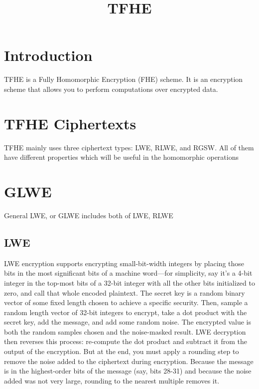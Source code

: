 \documentclass{techrep}
\title{TFHE}
\theoremstyle{definition}
\theoremstyle{plain}
\begin{document}
	\maketitle

	\section{Introduction}
TFHE is a Fully Homomorphic Encryption (FHE) scheme. It is an encryption scheme that allows you to perform computations over encrypted data. 

	\section{TFHE Ciphertexts}
 TFHE mainly uses three ciphertext types: LWE, RLWE, and RGSW. All of them have different properties which will be useful in the homomorphic operations

	\section{GLWE}
General LWE, or GLWE includes both of LWE, RLWE

\subsection{LWE}
LWE encryption supports encrypting small-bit-width integers by placing those bits in the most significant bits of a machine word—for simplicity, say it’s a 4-bit integer in the top-most bits of a 32-bit integer with all the other bits initialized to zero, and call that whole encoded plaintext. The secret key is a random binary vector of some fixed length chosen to achieve a specific security. Then, sample a random length vector of 32-bit integers to encrypt, take a dot product with the secret key, add the message, and add some random noise. The encrypted value is both the random samples chosen and the noise-masked result. LWE decryption then reverses this process: re-compute the dot product and subtract it from the output of the encryption. But at the end, you must apply a rounding step to remove the noise added to the ciphertext during encryption. Because the message is in the highest-order bits of the message (say, bits 28-31) and because the noise added was not very large, rounding to the nearest multiple removes it. 
\end{document}
